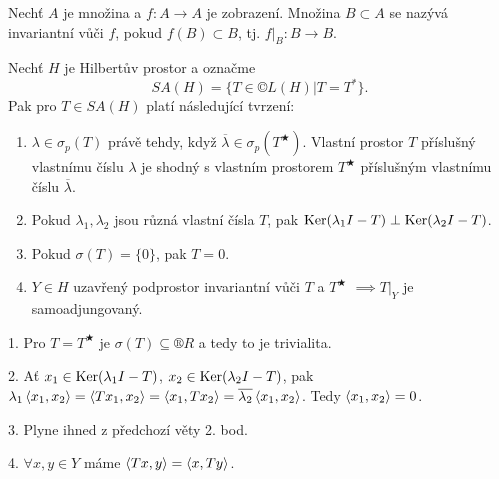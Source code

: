 \documentclass[12pt]{article}					%
\begin{document}
\begin{definice}
	Nechť $A$ je množina a $f: A \rightarrow A$ je zobrazení. Množina $B \subset A$ se nazývá invariantní vůči $f$, pokud $f(B) \subset B$, tj. $f|_B: B \rightarrow B$.
\end{definice}

\begin{lemma}
	Nechť $H$ je Hilbertův prostor a označme
	$$ SA(H) = \{T \in ©L(H)|T = T^*\}. $$
	Pak pro $T \in SA(H)$ platí následující tvrzení:

	\begin{enumerate}
		\item $\lambda \in \sigma_p(T)$ právě tehdy, když $\overline{\lambda} \in \sigma_p(T^\bigstar)$. Vlastní prostor $T$ příslušný vlastnímu číslu $\lambda$ je shodný s vlastním prostorem $T^\bigstar$ příslušným vlastnímu číslu $\overline{\lambda}$.
		\item Pokud $\lambda_1, \lambda_2$ jsou různá vlastní čísla $T$, pak $\operatorname{Ker}(\lambda_1 I - T) \perp \operatorname{Ker}(\lambda_2 I - T)$.
		\item Pokud $\sigma(T) = \{0\}$, pak $T = 0$.
		\item $Y \in H$ uzavřený podprostor invariantní vůči $T$ a $T^\bigstar$ $\implies T|_Y$ je samoadjungovaný.
	\end{enumerate}

	\begin{dukazin}
		1. Pro $T = T^\bigstar$ je $\sigma(T) \subseteq ®R$ a tedy to je trivialita.

		2. Ať $x_1 \in \operatorname{Ker} (\lambda_1 I - T)$, $x_2 \in \operatorname{Ker}(\lambda_2 I - T)$, pak $\lambda_1\left\langle x_1, x_2\right\rangle = \left\langle Tx_1, x_2\right\rangle = \left\langle x_1, Tx_2\right\rangle = \overline{\lambda_2}\left\langle x_1, x_2\right\rangle$. Tedy $\left\langle x_1, x_2\right\rangle = 0$.

		3. Plyne ihned z předchozí věty 2. bod.

		4. $\forall x, y \in Y$ máme $\left\langle Tx, y\right\rangle = \left\langle x, Ty\right\rangle$.
	\end{dukazin}
\end{lemma}
\end{document}
